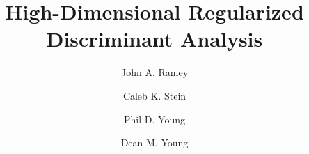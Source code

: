 \documentclass[review,authoryear]{elsarticle}
\begin{document}
\begin{frontmatter}

\title{High-Dimensional Regularized Discriminant Analysis}

\author[jar]{John A. Ramey}
\author[cks]{Caleb K. Stein}
\author[pdy]{Phil D. Young}
\author[dmy]{Dean M. Young}
\address[jar]{\textbf{Corresponding Author} \\ Novi Labs \\ 7020 Easy Wind Drive, Suite 210 \\ Austin, TX 78752 \\ USA \\ Email: johnramey@gmail.com}
\address[cks]{Myeloma Institute \\ University of Arkansas for Medical Sciences \\ 4018 W. Capitol Avenue \\ Little Rock, AR 72205 \\ USA \\ Email: stein.caleb@gmail.com}
\address[pdy]{Department of Management and Information Systems \\ Baylor University \\ One Bear Place \#98005 \\ Waco, TX 76798-8005 \\ USA \\ Email: Philip\_Young@baylor.edu}
\address[dmy]{Department of Statistical Science \\ Baylor University \\ P.O. Box 97140 \\ Waco, TX 76798-7140 \\ USA \\ Email: Dean\_Young@baylor.edu}

\end{frontmatter}
\end{document}
